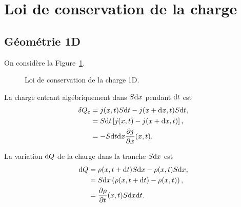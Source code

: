 \section{Loi de conservation de la charge}

    \subsection{Géométrie 1D}

        On considère la Figure~\ref{fig:conservation_charge_1d}.

        \begin{figure}
            \centering
            \caption{Loi de conservation de la charge 1D.}    
            \label{fig:conservation_charge_1d}
        \end{figure}

        La charge entrant algébriquement dans $S\mathrm{d} x$ pendant $\mathrm{d} t$ est 
        \begin{align}
            \delta Q_e
            &=
            j(x,t)S\mathrm{d} t-j(x+\mathrm{d} x,t)S\mathrm{d} t,\\
            &=
            S\mathrm{d} t\left[
                j(x,t)-j(x+\mathrm{d} x,t)
            \right],\\
            &=-S\mathrm{d} t\mathrm{d} x\frac{\partial j}{\partial x}(x,t).
        \end{align}

        La variation $\mathrm{d} Q$ de la charge dans la tranche $S\mathrm{d} x$ est 
        \begin{align}
            \mathrm{d} Q
            &=
            \rho(x,t+\mathrm{d} t)S\mathrm{d} x-\rho(x,t)S\mathrm{d} x,\\
            &=
            S\mathrm{d} x\left(\rho(x,t+\mathrm{d} t)-\rho(x,t)\right),\\
            &=
            \frac{\partial\rho}{\partial t}(x,t)S\mathrm{d} x\mathrm{d} t.
        \end{align}

